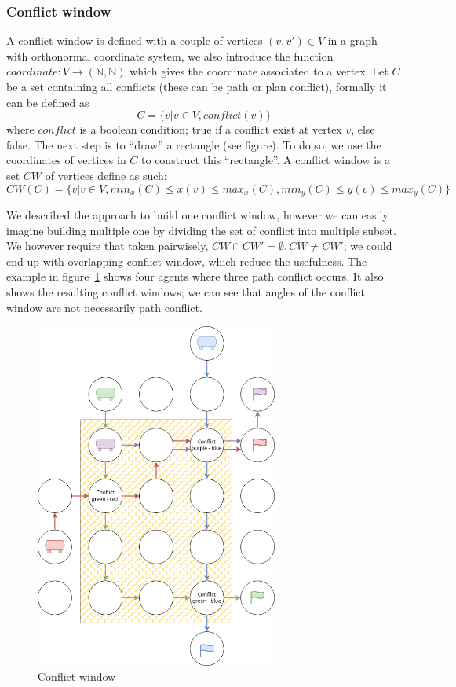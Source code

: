 \subsubsection{Conflict window}\label{sec:conflict_window}
A conflict window is defined with a couple of vertices \((v,v')\in V\) in a graph with orthonormal coordinate system, we also introduce the function \(coordinate:  V \rightarrow (\mathbb{N},\mathbb{N})\) which gives the coordinate associated to a vertex. Let \(C\) be a set containing all conflicts (these can be path or plan conflict), formally it can be defined as \[
    C = \{v  | v \in V, conflict(v)\}
\] where \(conflict\) is a boolean condition; true if a conflict exist at vertex \(v\), else false. The next step is to ``draw'' a rectangle (see  figure). To do so,  we use the coordinates of vertices in \(C\) to construct this ``rectangle''. A conflict window is a set \(CW\) of vertices define as such: \[
  CW(C) = \{ v | v \in V, min_x(C) \leq x(v) \leq max_x(C), min_y(C) \leq y(v) \leq max_y(C)\}
\]

We described the approach to build one conflict window, however we can easily imagine building multiple one by dividing the set of conflict into multiple subset. We however require that taken pairwisely, \(CW \cap   CW' = \emptyset, CW\neq CW' \); we could end-up with overlapping conflict window, which reduce the usefulness. The example in figure~\ref{img:conflict_window} shows four agents where three path conflict occurs. It also shows the resulting conflict windows; we can see that angles of the conflict window are not necessarily path conflict. 

\begin{figure}[H]
  \centering
  \caption{Conflict window}\label{img:conflict_window}
  \includegraphics[width=8cm]{img/conflict_window.drawio.png}
\end{figure}



